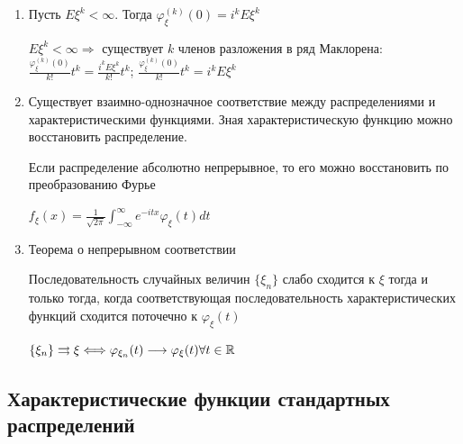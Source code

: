 \documentclass[12pt]{article}
\begin{document}
\begin{enumerate}
    \item Пусть $E\xi^k < \infty$. Тогда $\varphi_\xi^{(k)}(0) = i^k E\xi^k$

    \begin{MyProof}
        $E\xi^k < \infty \Longrightarrow$ существует $k$ членов разложения в ряд Маклорена: 
        $\frac{\varphi_\xi^{(k)}(0)}{k!}t^k = \frac{i^k E\xi^k}{k!} t^k$; $\frac{\varphi_\xi^{(k)}(0)}{k!}t^k = i^k E\xi^k$
    \end{MyProof}

    \item Существует взаимно-однозначное соответствие между распределениями и характеристическими функциями.
    Зная характеристическую функцию можно восстановить распределение.

    \Ex Если распределение абсолютно непрерывное, то его можно восстановить по преобразованию Фурье

    $f_\xi(x) = \frac{1}{\sqrt{2\pi}} \int_{-\infty}^{\infty} e^{-itx} \varphi_\xi(t) dt$

    \item Теорема о непрерывном соответствии
    
    \begin{MyTheorem}
        \Ths Последовательность случайных величин $\{\xi_n\}$ слабо сходится к $\xi$ тогда и только тогда, когда
        соответствующая последовательность характеристических функций сходится поточечно к $\varphi_\xi(t)$

        $\{\xi_n\} \rightrightarrows \xi \Longleftrightarrow \varphi_{\xi_n}(t) \longrightarrow \varphi_\xi(t) \forall t \in \mathbb{R}$
    \end{MyTheorem}

\end{enumerate}

\subsection{Характеристические функции стандартных распределений}

\hypertarget{characteristicfunctionofstandarddistributions}{}
\end{document}
